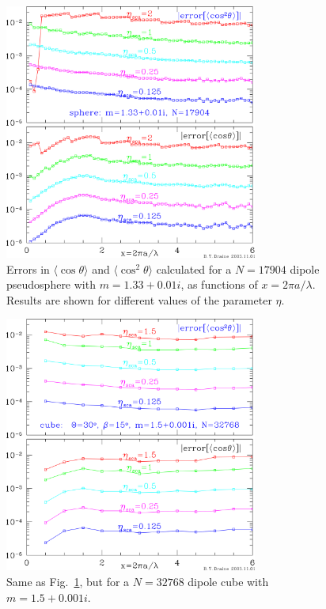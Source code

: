 \begin{figure}[h]
\begin{center}
\vspace*{-0.9cm}
\includegraphics[width=8.3cm]{f_sph_eta.png}
\vspace*{-2.2cm}
\caption{\label{fig:err_eta_sphere}
\footnotesize
Errors in $\langle\cos\theta\rangle$ 
and $\langle\cos^2\theta\rangle$ calculated for a $N=17904$ dipole
pseudosphere with $m=1.33+0.01i$,
as functions of $x=2\pi a/\lambda$.
Results are shown 
for different values of the parameter $\eta$.
}
\end{center}
\end{figure}

\begin{figure}[h]
\begin{center}
\vspace*{-0.9cm}
\includegraphics[width=8.3cm]{f_cube_eta.png}
\vspace*{-2.2cm}
\caption{\label{fig:err_eta_cube}
\footnotesize
Same as Fig.\ \ref{fig:err_eta_sphere}, but for a $N=32768$ dipole
cube with $m=1.5+0.001i$.
}
\end{center}
\end{figure}

